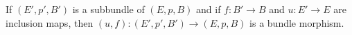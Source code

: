 If $(E', p', B')$ is a subbundle of $(E, p, B)$ and if $f: B' \rightarrow B$ and $u: E' \rightarrow E$ are inclusion maps, then $(u, f): (E', p', B') \rightarrow (E, p, B)$ is a bundle morphism.
